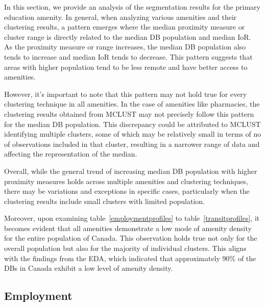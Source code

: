 \documentclass[11pt, a4paper]{article}
\begin{document}
In this section, we provide an analysis of the segmentation results for the primary education amenity. %
In general, when analyzing various amenities and their clustering results, a pattern emerges where the median proximity measure or cluster range is directly related to the median DB population and median IoR. As the proximity measure or range increases, the median DB population also tends to increase and median IoR tends to decrease. This pattern suggests that areas with higher population tend to be less remote and have better access to amenities.
\par
However, it's important to note that this pattern may not hold true for every clustering technique in all amenities. In the case of amenities like pharmacies, the clustering results obtained from MCLUST may not precisely follow this pattern for the median DB population. This discrepancy could be attributed to MCLUST identifying multiple clusters, some of which may be relatively small in terms of no of observations included in that cluster, resulting in a narrower range of data and affecting the representation of the median.
\par
Overall, while the general trend of increasing median DB population with higher proximity measures holds across multiple amenities and clustering techniques, there may be variations and exceptions in specific cases, particularly when the clustering results include small clusters with limited population.
\par
Moreover, upon examining table~\ref{employmentprofiles} to table~\ref{transitprofiles}, it becomes evident that all amenities demonstrate a low mode of amenity density for the entire population of Canada. This observation holds true not only for the overall population but also for the majority of individual clusters. This aligns with the findings from the EDA, which indicated that approximately 90\% of the DBs in Canada exhibit a low level of amenity density.



\pagebreak
\subsection{Employment}
\end{document}
